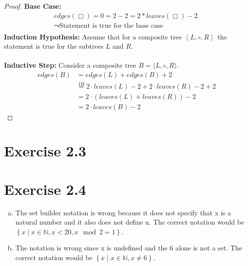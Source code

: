 \documentclass{article} %
\newcommand{\homeworkNumber}{2}
\begin{document}
\begin{proof}
	\textbf{Base Case:}
	\begin{align*}
		edges(\Box) = 0 = 2 - 2 = 2 * leaves(\Box) - 2 .     \\
		\leadsto \text{Statement is true for the base case } \\
	\end{align*}
	\textbf{Induction Hypothesis:} Assume that for a composite tree \( \left< L, \circ, R \right> \) the statement is true for the subtrees \( L \) and \( R \).
	\\
	\\
	\textbf{Inductive Step:}
	Consider a composite tree \( B = \langle L, \circ, R \rangle \).
	\begin{align*}
		edges(B) & = edges(L) + edges(B) + 2                                          \\
		         & \stackrel{IH}{=} 2 \cdot leaves(L) - 2 + 2 \cdot leaves(R) - 2 + 2 \\
		         & = 2 \cdot (leaves(L) + leaves(R)) -2                               \\
		         & = 2 \cdot leaves(B) - 2
	\end{align*}

\end{proof}

\section*{Exercise \homeworkNumber.3}


\section*{Exercise \homeworkNumber.4}
\begin{enumerate}[(a)]
	\item The set builder notation is wrong because it does not specify that x is a natural number and it also does not define n.
	      The correct notation would be \(\left\{ x \mid x \in \mathbb{N}, x < 20, x \mod 2 = 1 \right\}\).
	\item The notation is wrong since x is undefined and the 6 alone is not a set.
	      The correct notation would be \( \left\{ x \mid x \in \mathbb{N}, x \neq 6 \right\} \).
\end{enumerate}
\end{document}
